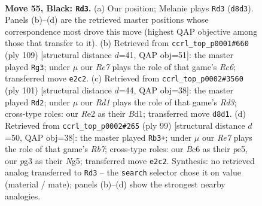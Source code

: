 \documentclass[11pt]{article}
\begin{document}
\clearpage

\begin{figure}[p]\centering
\begin{subfigure}{0.46\textwidth}\centering
\resizebox{\linewidth}{!}{%
\newchessgame
\chessboard[
  setfen={3r4/6k1/1pb5/p1p5/2N5/K1P3PN/4rp1P/5R2 b - - 7 55},
  showmover=false,
  pgfstyle=straightmove, color=movearrow, markmove={d8-d3}
]}
\caption{}
\end{subfigure}\hfill
\begin{subfigure}{0.46\textwidth}\centering
\resizebox{\linewidth}{!}{%
\newchessgame
\chessboard[
  setfen={5k2/5p2/3p2p1/7p/4PN1P/1pr5/4K3/1R6 b - - 15 55},
  showmover=false,
  pgfstyle=straightmove, color=movearrow, markmove={c3-g3}
]}
\caption{}
\end{subfigure}
\\[4pt]
\begin{subfigure}{0.46\textwidth}\centering
\resizebox{\linewidth}{!}{%
\newchessgame
\chessboard[
  setfen={4k3/7R/2pr4/2N2p1p/1P2pK2/4P3/5P2/3b4 b - - 0 51},
  showmover=false,
  pgfstyle=straightmove, color=movearrow, markmove={d6-d2}
]}
\caption{}
\end{subfigure}\hfill
\begin{subfigure}{0.46\textwidth}\centering
\resizebox{\linewidth}{!}{%
\newchessgame
\chessboard[
  setfen={R7/5p2/5N1k/4PPnp/6p1/4K1P1/pr5P/8 b - - 3 50},
  showmover=false,
  pgfstyle=straightmove, color=movearrow, markmove={b2-b3}
]}
\caption{}
\end{subfigure}
\caption{\textbf{Move 55, Black: \texttt{Rd3}.} (a) Our position; Melanie plays \texttt{Rd3} (\texttt{d8d3}). Panels (b)--(d) are the retrieved master positions whose correspondence most drove this move (highest QAP objective among those that transfer to it). (b) Retrieved from \texttt{ccrl\_top\_p0001\#660} (ply 109) [structural distance $d$=41, QAP obj=51]: the master played \texttt{Rg3}; under $\mu$ our \emph{Re7} plays the role of that game's \emph{Rc6}; transferred move \texttt{e2c2}. (c) Retrieved from \texttt{ccrl\_top\_p0002\#3560} (ply 101) [structural distance $d$=44, QAP obj=38]: the master played \texttt{Rd2}; under $\mu$ our \emph{Rd1} plays the role of that game's \emph{Rd3}; cross-type roles: our \emph{R}e2 as their \emph{B}d1; transferred move \texttt{d8d1}. (d) Retrieved from \texttt{ccrl\_top\_p0002\#265} (ply 99) [structural distance $d$=50, QAP obj=38]: the master played \texttt{Rb3+}; under $\mu$ our \emph{Re7} plays the role of that game's \emph{Rb7}; cross-type roles: our \emph{B}c6 as their \emph{p}e5, our \emph{p}g3 as their \emph{N}g5; transferred move \texttt{e2c2}. Synthesis: no retrieved analog transferred to \texttt{Rd3} -- the \texttt{search} selector chose it on value (material / mate); panels (b)--(d) show the strongest nearby analogies.}
\label{fig:thought-m109}
\end{figure}
\end{document}
